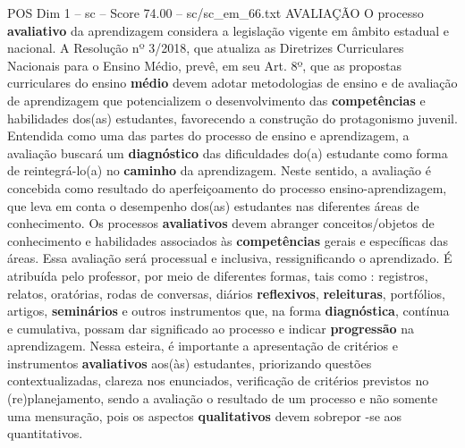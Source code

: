 \begin{textsample}{POS Dim 1 – sc – Score 74.00 – sc/sc\_em\_66.txt}
AVALIAÇÃO O processo \textbf{avaliativo} da aprendizagem considera a legislação vigente em âmbito estadual e nacional.
A Resolução nº 3/2018, que atualiza as Diretrizes Curriculares Nacionais para o Ensino Médio, prevê, em seu Art. 8º, que as propostas curriculares do ensino \textbf{médio} devem adotar metodologias de ensino e de avaliação de aprendizagem que potencializem o desenvolvimento das \textbf{competências} e habilidades dos(as) estudantes, favorecendo a construção do protagonismo juvenil.
Entendida como uma das partes do processo de ensino e aprendizagem, a avaliação buscará um \textbf{diagnóstico} das dificuldades do(a) estudante como forma de reintegrá-lo(a) no \textbf{caminho} da aprendizagem.
Neste sentido, a avaliação é concebida como resultado do aperfeiçoamento do processo ensino-aprendizagem, que leva em conta o desempenho dos(as) estudantes nas diferentes áreas de conhecimento.
Os processos \textbf{avaliativos} devem abranger conceitos/objetos de conhecimento e habilidades associados às \textbf{competências} gerais e específicas das áreas.
Essa avaliação será processual e inclusiva, ressignificando o aprendizado.
É atribuída pelo professor, por meio de diferentes formas, tais como : registros, relatos, oratórias, rodas de conversas, diários \textbf{reflexivos}, \textbf{releituras}, portfólios, artigos, \textbf{seminários} e outros instrumentos que, na forma \textbf{diagnóstica}, contínua e cumulativa, possam dar significado ao processo e indicar \textbf{progressão} na aprendizagem.
Nessa esteira, é importante a apresentação de critérios e instrumentos \textbf{avaliativos} aos(às) estudantes, priorizando questões contextualizadas, clareza nos enunciados, verificação de critérios previstos no (re)planejamento, sendo a avaliação o resultado de um processo e não somente uma mensuração, pois os aspectos \textbf{qualitativos} devem sobrepor -se aos quantitativos.

\end{textsample}
